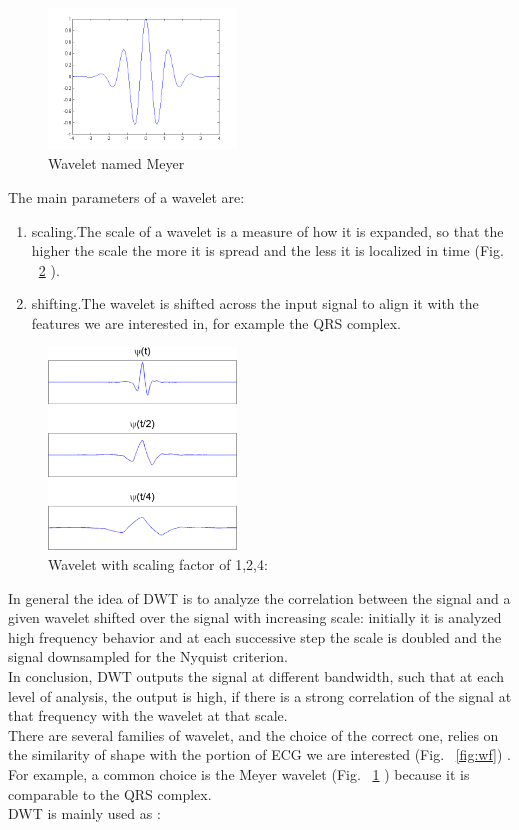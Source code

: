 \documentclass[LaM,binding=0.6cm]{sapthesis}
\begin{document}
\begin{figure}[H]
	\includegraphics[width=50mm,scale=0.7]{waveletexample.png}
	\caption{Wavelet named Meyer}
	\label{fig:we}
\end{figure}
The main parameters of a wavelet are:
\begin{enumerate}
\item scaling.The scale of a wavelet is a measure of how it is expanded, so that the higher the scale the more it is spread and the less it is localized in time (Fig. ~\ref{fig:ws} ).
\item shifting.The wavelet is shifted across the input signal to align it with the features we are interested in, for example the QRS complex.
\end{enumerate}
\begin{figure}[H]
	\includegraphics[width=50mm,scale=0.7]{wavescale.png}
	\caption{Wavelet with scaling factor of 1,2,4: \cite{matdwt} }
	\label{fig:ws}
\end{figure}
In general the idea of DWT is to analyze the correlation between the signal and a given wavelet shifted over the signal with increasing scale: initially it is analyzed high frequency behavior and at each successive step the scale is doubled and the signal downsampled for the Nyquist criterion.\\In conclusion, DWT outputs the signal at different bandwidth, such that at each level of analysis, the output is high, if there is a strong correlation of the signal at that frequency with the wavelet at that scale.\\There are several families of wavelet, and the choice of the correct one, relies on the similarity of shape with the portion of ECG we are interested (Fig. ~\ref{fig:wf}) .\\For example, a common choice is the Meyer wavelet (Fig. ~\ref{fig:we} ) because it is comparable to the QRS complex.\\DWT is mainly used as :
\end{document}
